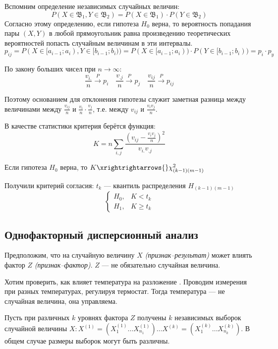 Вспомним определение независимых случайных величин:
\[P(X \in \mathfrak{B}_1, Y \in \mathfrak{B}_2) = P(X \in \mathfrak{B}_1) \cdot P(Y \in \mathfrak{B}_2)\]
Согласно этому определению, если гипотеза \(H_0\) верна, то вероятность попадания пары \((X, Y)\) в любой прямоугольник равна произведению теоретических вероятностей попасть случайным величинам в эти интервалы.
\[p_{ij} = P (X \in [a_{i-1}; a_i), Y \in [b_{i-1}; b_i)) = P(X \in [a_{i-1}; a_i)) \cdot P(Y \in [b_{i-1}; b_i)) = p_i \cdot p_y\]

По закону больших чисел при \(n \to \infty\):
\[\frac{v_{i.}}{n} \xrightarrow{P} p_i \quad \frac{v_{.j}}{n} \xrightarrow{P} p_j \quad \frac{v_{ij}}{n} \xrightarrow{P} p_{ij}\]

Поэтому основанием для отклонения гипотезы служит заметная разница между величинами между \(\frac{v_{ij}}{n}\) и \(\frac{v_i}{n} \cdot \frac{v_j}{n}\), т.е. между \(v_{ij}\) и \(\frac{v_iv_j}{n}\).

В качестве статистики критерия берётся функция:
\[K = n \sum_{i, j} \frac{\left(v_{ij} - \frac{v_iv_j}{n}\right)^2}{v_{i.}v_{.j}}\]

\begin{theorem}
    Если гипотеза \(H_0\) верна, то \(K \xrightrightarrows{} \chi^2_{(k - 1)(m - 1)}\)
\end{theorem}

Получили критерий согласия: \(t_k\) --- квантиль распределения \(H_{(k - 1)(m - 1)}\)
\[\begin{cases}
        H_0, & K < t_k    \\
        H_1, & K \geq t_k
    \end{cases}\]

\subsection{Однофакторный дисперсионный анализ}

Предположим, что на случайную величину \(X\) \textit{(признак--результат)} может влиять фактор \(Z\) \textit{(признак--фактор)}. \(Z\) --- не обязательно случайная величина.

\begin{example}
    Хотим проверить, как влияет температура на разложение \?. Проводим измерения при разных температурах, регулируя термостат. Тогда температура --- не случайная величина, она управляема.
\end{example}

Пусть при различных \(k\) уровнях фактора \(Z\) получены \(k\) независимых выборок случайной величины \(X : X^{(1)} = (X^{(1)}_1 \dots X^{(1)}_{n_1}) \dots X^{(k)} = (X^{(k)}_1 \dots X^{(k)}_{n_k})\). В общем случае размеры выборок могут быть различны.

